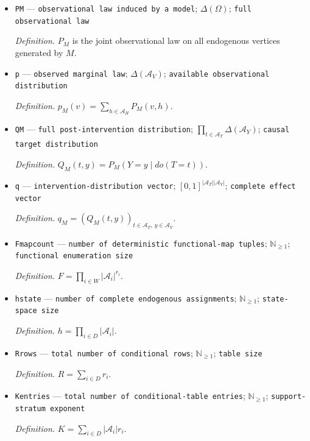 \documentclass{article}
\begin{document}
\begin{itemize}
  \par\smallskip\noindent\emph{Definition.} \(M=(G,\mathcal A,\theta)\).
  \item \texttt{PM} --- \texttt{observational law induced by a model}; \(\Delta(\Omega)\); \texttt{full observational law}
  \par\smallskip\noindent\emph{Definition.} \(P_M\) is the joint observational law on all endogenous vertices generated by \(M\).
  \item \texttt{p} --- \texttt{observed marginal law}; \(\Delta(\mathcal A_V)\); \texttt{available observational distribution}
  \par\smallskip\noindent\emph{Definition.} \(p_M(v)=\sum_{h\in\mathcal A_H}P_M(v,h)\).
  \item \texttt{QM} --- \texttt{full post-\allowbreak{}intervention distribution}; \(\prod_{t\in\mathcal A_T}\Delta(\mathcal A_Y)\); \texttt{causal target distribution}
  \par\smallskip\noindent\emph{Definition.} \(Q_M(t,y)=P_M(Y=y\mid do(T=t))\).
  \item \texttt{q} --- \texttt{intervention-\allowbreak{}distribution vector}; \([0,1]^{|\mathcal A_T||\mathcal A_Y|}\); \texttt{complete effect vector}
  \par\smallskip\noindent\emph{Definition.} \(q_M=(Q_M(t,y))_{t\in\mathcal A_T,\ y\in\mathcal A_Y}\).
  \item \texttt{Fmapcount} --- \texttt{number of deterministic functional-\allowbreak{}map tuples}; \(\mathbb N_{\ge 1}\); \texttt{functional enumeration size}
  \par\smallskip\noindent\emph{Definition.} \(F=\prod_{i\in W}|\mathcal A_i|^{r_i}\).
  \item \texttt{hstate} --- \texttt{number of complete endogenous assignments}; \(\mathbb N_{\ge 1}\); \texttt{state-\allowbreak{}space size}
  \par\smallskip\noindent\emph{Definition.} \(h=\prod_{i\in D}|\mathcal A_i|\).
  \item \texttt{Rrows} --- \texttt{total number of conditional rows}; \(\mathbb N_{\ge 1}\); \texttt{table size}
  \par\smallskip\noindent\emph{Definition.} \(R=\sum_{i\in D}r_i\).
  \item \texttt{Kentries} --- \texttt{total number of conditional-\allowbreak{}table entries}; \(\mathbb N_{\ge 1}\); \texttt{support-\allowbreak{}stratum exponent}
  \par\smallskip\noindent\emph{Definition.} \(K=\sum_{i\in D}|\mathcal A_i|r_i\).

\end{itemize}
\end{document}
